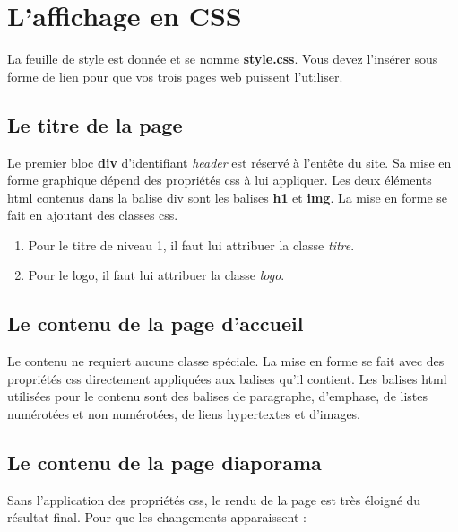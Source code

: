 \documentclass[11pt]{article}
\providecommand{\tightlist}{%
      \setlength{\itemsep}{0pt}\setlength{\parskip}{0pt}}
\begin{document}
    \hypertarget{laffichage-en-css}{%
\section{L'affichage en CSS}\label{laffichage-en-css}}

La feuille de style est donnée et se nomme \textbf{style.css}. Vous
devez l'insérer sous forme de lien pour que vos trois pages web puissent
l'utiliser.

\hypertarget{le-titre-de-la-page}{%
\subsection{Le titre de la page}\label{le-titre-de-la-page}}

Le premier bloc \textbf{div} d'identifiant \emph{header} est réservé à
l'entête du site. Sa mise en forme graphique dépend des propriétés css à
lui appliquer. Les deux éléments html contenus dans la balise div sont
les balises \textbf{h1} et \textbf{img}. La mise en forme se fait en
ajoutant des classes css.

\begin{enumerate}
\def\labelenumi{\arabic{enumi}.}
\tightlist
\item
  Pour le titre de niveau 1, il faut lui attribuer la classe
  \emph{titre}.
\item
  Pour le logo, il faut lui attribuer la classe \emph{logo}.
\end{enumerate}

\hypertarget{le-contenu-de-la-page-daccueil}{%
\subsection{Le contenu de la page
d'accueil}\label{le-contenu-de-la-page-daccueil}}

Le contenu ne requiert aucune classe spéciale. La mise en forme se fait
avec des propriétés css directement appliquées aux balises qu'il
contient. Les balises html utilisées pour le contenu sont des balises de
paragraphe, d'emphase, de listes numérotées et non numérotées, de liens
hypertextes et d'images.

\hypertarget{le-contenu-de-la-page-diaporama}{%
\subsection{Le contenu de la page
diaporama}\label{le-contenu-de-la-page-diaporama}}

Sans l'application des propriétés css, le rendu de la page est très
éloigné du résultat final. Pour que les changements apparaissent :
\end{document}
